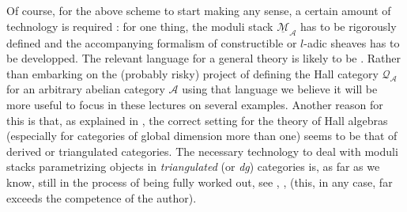 \documentclass[a4paper,10pt]{amsart}
\def\A{\mathcal{A}}
\numberwithin{equation}{section}
\begin{document}
 \vspace{.1in}
 
 Of course, for the above scheme to start making any sense, a certain amount of technology is required : for one thing, the moduli stack $\underline{\mathcal{M}}_{\A}$ has to be rigorously defined and the accompanying formalism of constructible or $l$-adic sheaves has to be developped. The relevant language for a general theory is likely to be \cite{Toen}.  Rather than embarking on the (probably risky) project of defining the Hall category $\mathcal{Q}_{\A}$ for an arbitrary abelian category $\A$ using that language we believe it will be more useful to focus in these lectures on several examples. 
 Another reason for this is that, as explained in \cite[Section~5]{Trieste}, the correct setting for the theory of Hall algebras (especially for categories of global dimension more than one) seems to be that of derived or triangulated categories. The necessary technology to deal with moduli stacks parametrizing objects in \textit{triangulated} (or \textit{dg}) categories is, as far as we know, still in the process of being fully worked out, see \cite{Toen}, \cite{Toen2}, (this, in any case, far exceeds the competence of the author).

 
 \vspace{.1in}
\end{document}

